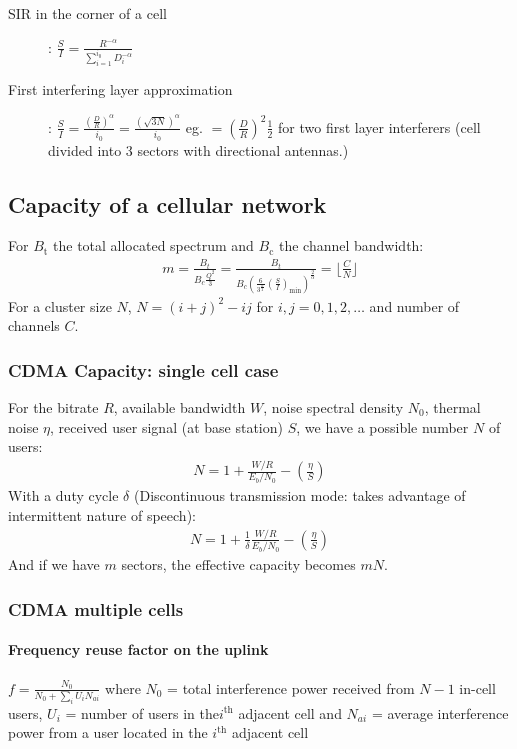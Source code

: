 \documentclass[6pt]{scrartcl}
\begin{document}
\begin{multicols}{4}
\begin{description}
\item[SIR in the corner of a cell]: $\frac{S}{I} = \frac{R^{-\alpha}}{\sum^{i_0}_{i=1}D_i^{-\alpha}}$

\item[First interfering layer approximation]: $\frac{S}{I} = \frac{(\frac{D}{R})^\alpha}{i_0} = \frac{(\sqrt{3N})^\alpha}{i_0}$ eg. $=(\frac{D}{R})^2\frac{1}{2}$ for two first layer interferers (cell divided into 3 sectors with directional antennas.)

\end{description}

\subsection{Capacity of a cellular network}
For $B_\textrm{t}$ the total allocated spectrum and $B_\textrm{c}$ the channel bandwidth: 
\begin{align*}
m = \frac{B_t}{B_c \frac{Q^2}{3}} = \frac{B_t}{B_c\left(\frac{6}{3^{\frac{\alpha}{2}}}\left(\frac{S}{I}\right)_\textrm{min}\right)^{\frac{2}{\alpha}}} = \lfloor\frac CN\rfloor
\end{align*}
For a cluster size $N$, $N = (i + j)^2 - ij$ for $i,j=0,1,2,\ldots$ and number of channels $C$.

\subsubsection{CDMA Capacity: single cell case}
For the bitrate $R$, available bandwidth $W$, noise spectral density $N_0$, thermal noise $\eta$, received user signal (at base station) $S$, we have a possible number $N$ of users:
\begin{align*}
	N = 1 + \frac{W/R}{E_b/N_0} - (\frac{\eta}{S})
\end{align*}
With a duty cycle $\delta$ (Discontinuous transmission mode: takes advantage of
intermittent nature of speech):
\begin{align*}
	N = 1 + \frac1\delta\frac{W/R}{E_b/N_0} - (\frac{\eta}{S})
\end{align*}
And if we have $m$ sectors, the effective capacity becomes $mN$.
\subsubsection{CDMA multiple cells}
\paragraph{Frequency reuse factor on the uplink} 
$f = \frac{N_0}{N_0 + \sum_iU_iN_{ai}}$ where $N_0$ = total interference power received from $N-1$ in-cell users, $U_i$ = number of users in the$i^\text{th}$ adjacent cell and $N_{ai}$ = average interference power from a user located in the $i^\text{th}$ adjacent cell


\end{multicols}
\end{document}
